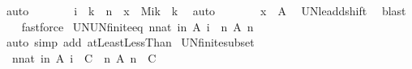 \begin{isabellebody}
\ auto\isanewline
\ \ \ \ \isamarkupfalse%
\ \isamarkupfalse%
\ {\isachardoublequoteopen}i\ {\isacharminus}{\kern0pt}\ k\ {\isacharless}{\kern0pt}\ n\ {\isasymand}\ x\ {\isasymin}\ M{\isacharparenleft}{\kern0pt}{\isacharparenleft}{\kern0pt}i{\isacharminus}{\kern0pt}k{\isacharparenright}{\kern0pt}\ {\isacharplus}{\kern0pt}\ k{\isacharparenright}{\kern0pt}{\isachardoublequoteclose}\ \isamarkupfalse%
\ auto\isanewline
\ \ \ \ \isamarkupfalse%
\ \isamarkupfalse%
\ {\isachardoublequoteopen}x\ {\isasymin}\ {\isacharquery}{\kern0pt}A{\isachardoublequoteclose}\ \isamarkupfalse%
\ UN{\isacharunderscore}{\kern0pt}le{\isacharunderscore}{\kern0pt}add{\isacharunderscore}{\kern0pt}shift\ \isamarkupfalse%
\ blast\isanewline
\ \ \isamarkupfalse%
\isanewline
{}\isamarkupfalse%
\ {\isacharparenleft}{\kern0pt}fastforce{\isacharparenright}{\kern0pt}%
\endisatagproof
{\isafoldproof}%
%
\isadelimproof
\isanewline
%
\endisadelimproof
\isanewline
{}\isamarkupfalse%
\ UN{\isacharunderscore}{\kern0pt}UN{\isacharunderscore}{\kern0pt}finite{\isacharunderscore}{\kern0pt}eq{\isacharcolon}{\kern0pt}\ {\isachardoublequoteopen}{\isacharparenleft}{\kern0pt}{\isasymUnion}n{\isacharcolon}{\kern0pt}{\isacharcolon}{\kern0pt}nat{\isachardot}{\kern0pt}\ {\isasymUnion}i{\isasymin}{\isacharbraceleft}{\kern0pt}{}{\isachardot}{\kern0pt}{\isachardot}{\kern0pt}{\isacharless}{\kern0pt}n{\isacharbraceright}{\kern0pt}{\isachardot}{\kern0pt}\ A\ i{\isacharparenright}{\kern0pt}\ {\isacharequal}{\kern0pt}\ {\isacharparenleft}{\kern0pt}{\isasymUnion}n{\isachardot}{\kern0pt}\ A\ n{\isacharparenright}{\kern0pt}{\isachardoublequoteclose}\isanewline
%
\isadelimproof
\ \ %
\endisadelimproof
%
\isatagproof
{}\isamarkupfalse%
\ {\isacharparenleft}{\kern0pt}auto\ simp\ add{\isacharcolon}{\kern0pt}\ atLeast{}LessThan{\isacharparenright}{\kern0pt}%
\endisatagproof
{\isafoldproof}%
%
\isadelimproof
\isanewline
%
\endisadelimproof
\isanewline
{}\isamarkupfalse%
\ UN{\isacharunderscore}{\kern0pt}finite{\isacharunderscore}{\kern0pt}subset{\isacharcolon}{\kern0pt}\isanewline
\ \ {\isachardoublequoteopen}{\isacharparenleft}{\kern0pt}{\isasymAnd}n{\isacharcolon}{\kern0pt}{\isacharcolon}{\kern0pt}nat{\isachardot}{\kern0pt}\ {\isacharparenleft}{\kern0pt}{\isasymUnion}i{\isasymin}{\isacharbraceleft}{\kern0pt}{}{\isachardot}{\kern0pt}{\isachardot}{\kern0pt}{\isacharless}{\kern0pt}n{\isacharbraceright}{\kern0pt}{\isachardot}{\kern0pt}\ A\ i{\isacharparenright}{\kern0pt}\ {\isasymsubseteq}\ C{\isacharparenright}{\kern0pt}\ {\isasymLongrightarrow}\ {\isacharparenleft}{\kern0pt}{\isasymUnion}n{\isachardot}{\kern0pt}\ A\ n{\isacharparenright}{\kern0pt}\ {\isasymsubseteq}\ C{\isachardoublequoteclose}\isanewline

\end{isabellebody}
